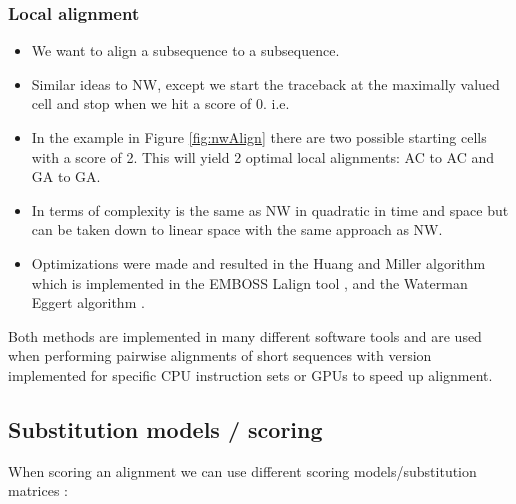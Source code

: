 \documentclass[
  11pt,
  twoside]{scrbook}
\begin{document}
\hypertarget{local-alignment}{%
\subsubsection{Local alignment}\label{local-alignment}}

\begin{itemize}
\item
  We want to align a subsequence to a subsequence.
\item
  Similar ideas to NW, except we start the traceback at the maximally valued cell and stop when we hit a score of 0. i.e.
\item
  In the example in Figure \ref{fig:nwAlign} there are two possible starting cells with a score of 2. This will yield 2 optimal local alignments: AC to AC and GA to GA.
\item
  In terms of complexity is the same as NW in quadratic in time and space \autocite{sungAlgorithmsBioinformaticsPractical2011} but can be taken down to linear space with the same approach as NW.
\item
  Optimizations were made and resulted in the Huang and Miller algorithm \autocite{huangTimeefficientLinearspaceLocal1991} which is implemented in the EMBOSS Lalign tool \autocite{riceEMBOSSEuropeanMolecular2000}, and the Waterman Eggert algorithm \autocite{watermanNewAlgorithmBest1987}.
\end{itemize}

Both methods are implemented in many different software tools and are used when performing pairwise alignments of short sequences \autocite{stajichBioperlToolkitPerl2002,gentlemanBioconductorOpenSoftware2004,riceEMBOSSEuropeanMolecular2000} with version implemented for specific CPU instruction sets \autocite{dailyParasailSIMDLibrary2016} or GPUs \autocite{frohmbergGPASImprovedVersion2012} to speed up alignment.

\hypertarget{substitution-models-scoring}{%
\subsection{Substitution models / scoring}\label{substitution-models-scoring}}

When scoring an alignment we can use different scoring models/substitution matrices \autocite{altschulSubstitutionMatrices2013}:
\end{document}
